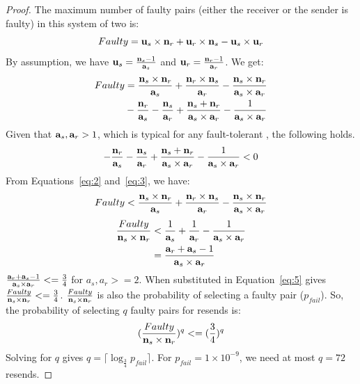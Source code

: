 \begin{proof}
The maximum number of faulty pairs (either the receiver or the sender is faulty) in this system of two  is:
\begin{equation}
Faulty = \textbf{u}_{s} \times \textbf{n}_{r} + \textbf{u}_{r} \times \textbf{n}_{s} - \textbf{u}_{s} \times \textbf{u}_{r}   
\end{equation}
By assumption, we have $\textbf{u}_{s} = \frac{\textbf{n}_{s}-1}{\textbf{a}_{s}}$ and $\textbf{u}_{r} = \frac{\textbf{n}_{r}-1}{\textbf{a}_{r}}$.
We get:
\begin{equation}\label{eq:2}
\begin{split}
Faulty  & = \frac{\textbf{n}_{s} \times \textbf{n}_{r}}{\textbf{a}_{s}} + \frac{\textbf{n}_{r} \times \textbf{n}_{s}}{\textbf{a}_{r}} - \frac{\textbf{n}_{s} \times \textbf{n}_{r}}{\textbf{a}_{s} \times \textbf{a}_{r}} \\
        & - \frac{\textbf{n}_{r}}{\textbf{a}_{s}} - \frac{\textbf{n}_{s}}{\textbf{a}_{r}} + \frac{\textbf{n}_{s} + \textbf{n}_{r}}{\textbf{a}_{s} \times \textbf{a}_{r}} - \frac{1}{\textbf{a}_{s} \times \textbf{a}_{r}}
\end{split}
\end{equation}
Given that $\textbf{a}_{s}, \textbf{a}_{r} > 1$, which is typical for any fault-tolerant \RSM{}, the following holds. 
\begin{equation}\label{eq:3}
    - \frac{\textbf{n}_{r}}{\textbf{a}_{s}} - \frac{\textbf{n}_{s}}{\textbf{a}_{r}} + \frac{\textbf{n}_{s} + \textbf{n}_{r}}{\textbf{a}_{s} \times \textbf{a}_{r}} - \frac{1}{\textbf{a}_{s} \times \textbf{a}_{r}} < 0
\end{equation}
From Equations~\ref{eq:2} and~\ref{eq:3}, we have:
\begin{equation}\label{eq:4}
Faulty  < \frac{\textbf{n}_{s} \times \textbf{n}_{r}}{\textbf{a}_{s}} + \frac{\textbf{n}_{r} \times \textbf{n}_{s}}{\textbf{a}_{r}} - \frac{\textbf{n}_{s} \times \textbf{n}_{r}}{\textbf{a}_{s} \times \textbf{a}_{r}}
\end{equation}
\begin{equation}\label{eq:5}
\begin{split}
\frac{Faulty}{\textbf{n}_{s} \times \textbf{n}_{r}}   & < \frac{1}{\textbf{a}_{s}} + \frac{1}{\textbf{a}_{r}} - \frac{1}{\textbf{a}_{s} \times \textbf{a}_{r}} \\
                                    & = \frac{\textbf{a}_{r} + \textbf{a}_{s} - 1}{\textbf{a}_{s} \times \textbf{a}_{r}}
\end{split}
\end{equation}
 $\frac{\textbf{a}_{r} + \textbf{a}_{s} - 1}{\textbf{a}_{s} \times \textbf{a}_{r}} <= \frac{3}{4}$ for $a_s,a_r>=2$. When substituted in Equation~\ref{eq:5} gives $\frac{Faulty}{\textbf{n}_{s} \times \textbf{n}_{r}} <= \frac{3}{4}$.
 $\frac{Faulty}{\textbf{n}_{s} \times \textbf{n}_{r}}$ is also the probability of selecting a faulty pair ($p_{fail}$).
So, the probability of selecting $q$ faulty pairs for resends is:
\begin{equation}
 (\frac{Faulty}{\textbf{n}_{s} \times \textbf{n}_{r}})^q  <= (\frac{3}{4})^q
\end{equation}
Solving for $q$ gives $q = \lceil \log_{\frac{3}{4}}{p_{fail}} \rceil$.
For $p_{fail} = 1 \times 10^{-9}$, we need at most $q = 72$ resends.
\end{proof}

